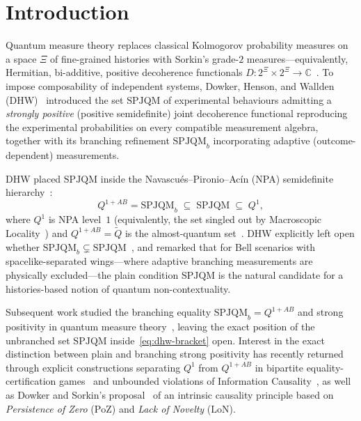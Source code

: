 \documentclass[11pt,a4paper]{article}
\theoremstyle{definition}
\theoremstyle{remark}
\newcommand{\SPJQM}{\mathrm{SPJQM}}
\newcommand{\SPJQMb}{\mathrm{SPJQM}_b}
\newcommand{\Qone}{Q^{1}}
\newcommand{\QAB}{Q^{1+AB}}
\newcommand{\tQ}{\widetilde{Q}}
\newcommand{\PoZ}{\mathrm{PoZ}}
\newcommand{\LoN}{\mathrm{LoN}}
\begin{document}
\section{Introduction}
\label{sec:intro}

Quantum measure theory replaces classical Kolmogorov probability measures on a space $\Xi$ of fine-grained histories with Sorkin's grade-$2$ measures---equivalently, Hermitian, bi-additive, positive decoherence functionals $D : 2^{\Xi} \times 2^{\Xi} \to \mathbb{C}$~\cite{Sorkin1994,Dowker2010}. To impose composability of independent systems, Dowker, Henson, and Wallden (DHW)~\cite{DHW2014} introduced the set $\SPJQM$ of experimental behaviours admitting a \emph{strongly positive} (positive semidefinite) joint decoherence functional reproducing the experimental probabilities on every compatible measurement algebra, together with its branching refinement $\SPJQMb$ incorporating adaptive (outcome-dependent) measurements.

DHW placed $\SPJQM$ inside the Navascu\'es--Pironio--Ac\'in (NPA) semidefinite hierarchy~\cite{NPA2007,NPA2008}:
\begin{equation}\label{eq:dhw-bracket}
\QAB = \SPJQMb \;\subseteq\; \SPJQM \;\subseteq\; \Qone,
\end{equation}
where $\Qone$ is NPA level~$1$ (equivalently, the set singled out by Macroscopic Locality~\cite{NavascuesWunderlich2010}) and $\QAB = \tQ$ is the almost-quantum set~\cite{Navascues2015}. DHW explicitly left open whether $\SPJQMb \subsetneq \SPJQM$~\cite[Sec.~6, L1166--1167]{DHW2014}, and remarked that for Bell scenarios with spacelike-separated wings---where adaptive branching measurements are physically excluded---the plain condition $\SPJQM$ is the natural candidate for a histories-based notion of quantum non-contextuality.

Subsequent work studied the branching equality $\SPJQMb = \QAB$ and strong positivity in quantum measure theory~\cite{HensonSainz2015,DowkerWilkes2021,DowkerSorkin2023}, leaving the exact position of the unbranched set $\SPJQM$ inside~\eqref{eq:dhw-bracket} open. Interest in the exact distinction between plain and branching strong positivity has recently returned through explicit constructions separating $\Qone$ from $\QAB$ in bipartite equality-certification games~\cite{Gazi2026} and unbounded violations of Information Causality~\cite{DasBhowmikBanik2026}, as well as Dowker and Sorkin's proposal~\cite{DowkerSorkin2023} of an intrinsic causality principle based on \emph{Persistence of Zero} ($\PoZ$) and \emph{Lack of Novelty} ($\LoN$).
\end{document}
